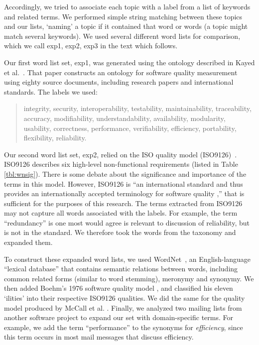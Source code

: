 \documentclass[]{sig-alternate}
\begin{document}
Accordingly, we tried to associate each topic with a label from a list of keywords and related terms. We performed simple string matching between these topics and our lists, `naming' a topic if it contained that word or words (a topic might match several keywords). We used several different word lists for comparison, which we call \textsf{exp1, exp2, exp3} in the text which follows. 

Our first word list set, \textsf{exp1}, was generated using the ontology described in Kayed et al.~\cite{5072519}. That paper constructs an ontology for software quality measurement using eighty source documents, including research papers and international standards. The labels we used:
\begin{quotation}
\small \noindent \textsf{
integrity, security,
interoperability, testability, maintainability, traceability,
accuracy, modifiability, understandability, availability, modularity,
usability, correctness, performance, verifiability, efficiency,
portability, flexibility, reliability.
}
\end{quotation}

Our second word list set, \textsf{exp2}, relied on the ISO quality model (ISO9126)~\cite{iso9126}. ISO9126 describes six high-level non-functional requirements (listed in Table \ref{tbl:wnsig}). There is some debate about the significance and importance of the terms in this model. However, ISO9126 is ``an international standard and thus provides an internationally accepted terminology for software quality \cite[p. 58]{Boegh2008},'' that is sufficient for the purposes of this research. The terms extracted from ISO9126 may not capture all words associated with the labels.  For example, the term ``redundancy'' is one most would agree is relevant to discussion of reliability, but is not in the standard. We therefore took the words from the taxonomy and expanded them.

To construct these expanded word lists, we used WordNet~\cite{Fellbaum1998}, an English-language ``lexical database'' that contains semantic relations between words, including common related forms (similar to word stemming), meronymy and synonymy. We then added Boehm's 1976 software quality model \cite{Boehm+:1976:ICSE}, and classified his eleven `ilities' into their respective ISO9126 qualities. We did the same for the quality model produced by McCall et al. \cite{mccall1977}. Finally, we analyzed two mailing lists from another software project to expand our set with domain-specific terms. For example, we add the term ``performance'' to the synonyms for \emph{efficiency}, since this term occurs in most mail messages that discuss efficiency.
\end{document}
